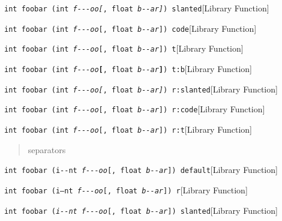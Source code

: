 \documentclass{book}
\begin{document}
%
\noindent\texttt{int foobar (int \textsl{f{-}{-}{-}oo}\textsl{[}, float \textsl{b{-}{-}ar}\textsl{]}) slanted}\hfill[Library Function]



%
\noindent\texttt{int foobar (int \textsl{f{-}{-}{-}oo}\texttt{[}, float \textsl{b{-}{-}ar}\texttt{]}) code}\hfill[Library Function]



%
\noindent\texttt{int foobar (int \textsl{f{-}{-}{-}oo}\texttt{[}, float \textsl{b{-}{-}ar}\texttt{]}) t}\hfill[Library Function]



%
\noindent\texttt{int foobar (int \textsl{f{-}{-}{-}oo}\texttt{\textbf{[}}, float \textsl{b{-}{-}ar}\texttt{\textbf{]}}) t:b}\hfill[Library Function]



%
\noindent\texttt{int foobar (int \textsl{f{-}{-}{-}oo}\textnormal{\textsl{[}}, float \textsl{b{-}{-}ar}\textnormal{\textsl{]}}) r:slanted}\hfill[Library Function]



%
\noindent\texttt{int foobar (int \textsl{f{-}{-}{-}oo}\textnormal{\texttt{[}}, float \textsl{b{-}{-}ar}\textnormal{\texttt{]}}) r:code}\hfill[Library Function]



%
\noindent\texttt{int foobar (int \textsl{f{-}{-}{-}oo}\textnormal{\texttt{[}}, float \textsl{b{-}{-}ar}\textnormal{\texttt{]}}) r:t}\hfill[Library Function]



%
\begin{quote}
\unskip{\parskip=0pt\noindent}%
separators
\end{quote}

\noindent\texttt{int foobar (i{-}{-}nt \textsl{f{-}{-}{-}oo}[, float \textsl{b{-}{-}ar}]) default}\hfill[Library Function]



%
\noindent\texttt{int foobar (\textnormal{i--nt} \textsl{f{-}{-}{-}oo}[, float \textsl{b{-}{-}ar}]) r}\hfill[Library Function]



%
\noindent\texttt{int foobar (\textsl{i{-}{-}nt} \textsl{f{-}{-}{-}oo}[, float \textsl{b{-}{-}ar}]) slanted}\hfill[Library Function]
\end{document}
